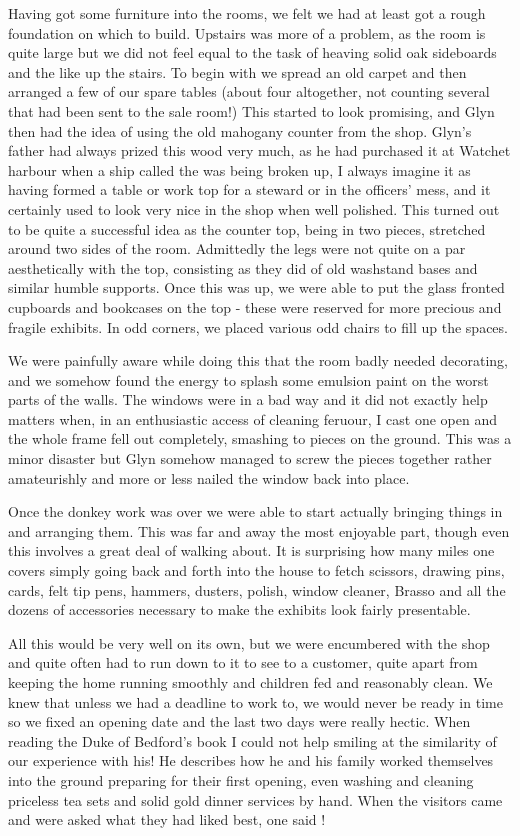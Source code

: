 Having got some furniture into the rooms, we felt we had at least got a rough foundation on which to build. Upstairs was more of a problem, as the room is quite large but we did not feel equal to the task of heaving solid oak sideboards and the like up the stairs. To begin with we spread an old carpet and then arranged a few of our spare tables (about four altogether, not counting several that had been sent to the sale room!) This started to look promising, and Glyn then had the idea of using the old mahogany counter from the shop. Glyn's father had always prized this wood very much, as he had purchased it at Watchet harbour when a ship called the  was being broken up, I always imagine it as having formed a table or work top for a steward or in the officers' mess, and it certainly used to look very nice in the shop when well polished. This turned out to be quite a successful idea as the counter top, being in two pieces, stretched around two sides of the room. Admittedly the legs were not quite on a par aesthetically with the top, consisting as they did of old washstand bases and similar humble supports. Once this was up, we were able to put the glass fronted cupboards and bookcases on the top - these were reserved for more precious and fragile exhibits. In odd corners, we placed various odd chairs to fill up the spaces.

We were painfully aware while doing this that the room badly needed decorating, and we somehow found the energy to splash some emulsion paint on the worst parts of the walls. The windows were in a bad way and it did not exactly help matters when, in an enthusiastic access of cleaning feruour, I cast one open and the whole frame fell out completely, smashing to pieces on the ground. This was a minor disaster but Glyn somehow managed to screw the pieces together rather amateurishly and more or less nailed the window back into place.

Once the donkey work was over we were able to start actually bringing things in and arranging them. This was far and away the most enjoyable part, though even this involves a great deal of walking about. It is surprising how many miles one covers simply going back and forth into the house to fetch scissors, drawing pins, cards, felt tip pens, hammers, dusters, polish, window cleaner, Brasso and all the dozens of accessories necessary to make the exhibits look fairly presentable.

All this would be very well on its own, but we were encumbered with the shop and quite often had to run down to it to see to a customer, quite apart from keeping the home running smoothly and children fed and reasonably clean. We knew that unless we had a deadline to work to, we would never be ready in time so we fixed an opening date and the last two days were really hectic. When reading the Duke of Bedford's book  I could not help smiling at the similarity of our experience with his! He describes how he and his family worked themselves into the ground preparing for their first opening, even washing and cleaning priceless tea sets and solid gold dinner services by hand. When the visitors came and were asked what they had liked best, one said !

